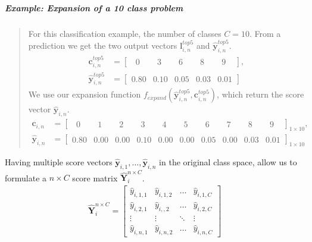 \subparagraph{Example: Expansion of a 10 class problem} 
\blockquote[]{	 	
	For this classification example, the number of classes $C=10$. From a prediction we get the two output vectors $\mathbf{l}_{i,n}^{top5}$ and $ \mathbf{\hat{y}}_{i,n}^{top5}$.
	\begin{align*}
	\mathbf{c}_{i,n}^{top5} &= \begin{bmatrix}
	\phantom{0}0\phantom{.0} & \phantom{0}3\phantom{.0} & \phantom{0}6\phantom{.0} & \phantom{0}8\phantom{.0} & \phantom{0}9\phantom{.0}
	\end{bmatrix},\\
	\mathbf{\hat{y}}_{i,n}^{top5} &= \begin{bmatrix}
	0.80 & 0.10 & 0.05 & 0.03 & 0.01
	\end{bmatrix}
	\end{align*}
	We use our expansion function $ f_{expand}\left(\bm{\hat{y}}_{i,n}^{top5},\mathbf{c}_{i,n}^{top5}\right) $, which return the score vector $ \mathbf{\hat{y}}_{i,n}$.
	\begin{align*}
	\mathbf{c}_{i,n} &= \begin{bmatrix}
	\phantom{0}0\phantom{.0} & \phantom{0}1\phantom{.0} & \phantom{0}2\phantom{.0} & \phantom{0}3\phantom{.0} & \phantom{0}4\phantom{.0} & \phantom{0}5\phantom{.0} & \phantom{0}6\phantom{.0} & \phantom{0}7\phantom{.0} & \phantom{0}8\phantom{.0} & \phantom{0}9\phantom{.0}
	\end{bmatrix}_{1 \times 10},\\
	\mathbf{\hat{y}}_{i,n}  &= \begin{bmatrix}
	0.80 & 0.00 & 0.00 & 0.10 & 0.00 & 0.00 & 0.05 & 0.00 & 0.03 & 0.01
	\end{bmatrix}_{1 \times 10}
	\end{align*}
}      

Having multiple score vectors $ \bm{\hat{y}}_{i,1}, \dots, \bm{\hat{y}}_{i,n} $ in the original class space, allow us to formulate a $ n \times C $ score matrix $ \bm{\hat{Y}}_{i}^{n \times C} $.
\begin{align}
	\bm{\hat{Y}}_{i}^{n \times C} =
	\begin{bmatrix}
		\hat{y}_{i,1,1} & \hat{y}_{i,1,2} & \dots & \hat{y}_{i,1,C} \\
		\hat{y}_{i,2,1} & \hat{y}_{i,,2} & \dots & \hat{y}_{i,2,C} \\
		\vdots & \vdots & \ddots & \vdots \\
		\hat{y}_{i,n,1} & \hat{y}_{i,n,2} & \dots & \hat{y}_{i,n,C}
	\end{bmatrix}
\end{align}

